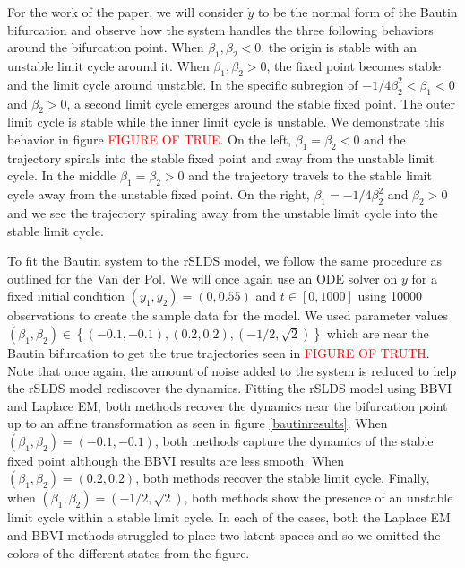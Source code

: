 For the work of the paper, we will consider $\dot{y}$ to be the normal form of the Bautin bifurcation and observe how the system handles the three following behaviors around the bifurcation point. When $\beta_1,\beta_2 < 0$, the origin is stable with an unstable limit cycle around it. When $\beta_1,\beta_2 > 0$, the fixed point becomes stable and the limit cycle around unstable. In the specific subregion of $-1/4 \beta_2^2 < \beta_1 < 0$ and $\beta_2>0$, a second limit cycle emerges around the stable fixed point. The outer limit cycle is stable while the inner limit cycle is unstable. We demonstrate this behavior in figure \textcolor{red}{FIGURE OF TRUE}. On the left, $\beta_1 = \beta_2 < 0$ and the trajectory spirals into the stable fixed point and away from the unstable limit cycle. In the middle $\beta_1 = \beta_2 > 0$ and the trajectory travels to the stable limit cycle away from the unstable fixed point. On the right, $\beta_1 = -1/4 \beta_2^2$ and $\beta_2 > 0$ and we see the trajectory spiraling away from the unstable limit cycle into the stable limit cycle. 

To fit the Bautin system to the rSLDS model, we follow the same procedure as outlined for the Van der Pol. We will once again use an ODE solver on $\dot{y}$ for a fixed initial condition $(y_1,y_2) = (0,0.55)$ and $t\in[0,1000]$ using 10000 observations to create the sample data for the model. We used parameter values $(\beta_1,\beta_2) \in \left\{(-0.1,-0.1),(0.2,0.2),\left(-1/2,\sqrt{2}\right)\right\}$ which are near the Bautin bifurcation to get the true trajectories seen in \textcolor{red}{FIGURE OF TRUTH}. Note that once again, the amount of noise added to the system is reduced to help the rSLDS model rediscover the dynamics. Fitting the rSLDS model using BBVI and Laplace EM, both methods recover the dynamics near the bifurcation point up to an affine transformation as seen in figure \ref{bautinresults}. When $(\beta_1,\beta_2) = (-0.1,-0.1)$, both methods capture the dynamics of the stable fixed point although the BBVI results are less smooth. When $(\beta_1,\beta_2) = (0.2,0.2)$, both methods recover the stable limit cycle. Finally, when $(\beta_1,\beta_2) = (-1/2,\sqrt{2})$, both methods show the presence of an unstable limit cycle within a stable limit cycle. In each of the cases, both the Laplace EM and BBVI methods struggled to place two latent spaces and so we omitted the colors of the different states from the figure.  

